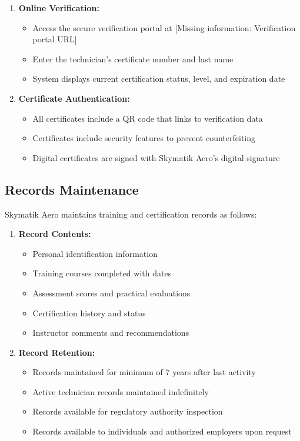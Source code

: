\documentclass[12pt,a4paper,twoside,openright]{book}
\begin{document}
\begin{enumerate}
    \item \textbf{Online Verification:}
    \begin{itemize}
        \item Access the secure verification portal at {\color{missingred}[Missing information: Verification portal URL]}
        \item Enter the technician's certificate number and last name
        \item System displays current certification status, level, and expiration date
    \end{itemize}
    
    \item \textbf{Certificate Authentication:}
    \begin{itemize}
        \item All certificates include a QR code that links to verification data
        \item Certificates include security features to prevent counterfeiting
        \item Digital certificates are signed with Skymatik Aero's digital signature
    \end{itemize}
\end{enumerate}

\subsection{Records Maintenance}

Skymatik Aero maintains training and certification records as follows:

\begin{enumerate}
    \item \textbf{Record Contents:}
    \begin{itemize}
        \item Personal identification information
        \item Training courses completed with dates
        \item Assessment scores and practical evaluations
        \item Certification history and status
        \item Instructor comments and recommendations
    \end{itemize}
    
    \item \textbf{Record Retention:}
    \begin{itemize}
        \item Records maintained for minimum of 7 years after last activity
        \item Active technician records maintained indefinitely
        \item Records available for regulatory authority inspection
        \item Records available to individuals and authorized employers upon request
    \end{itemize}
\end{enumerate}
\end{document}
